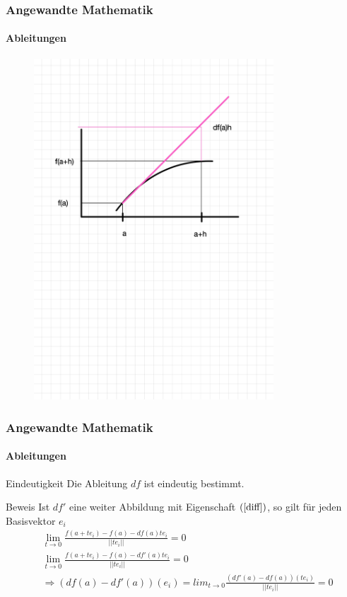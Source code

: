 \documentclass{beamer}
\begin{document}
  \begin{frame}
    \frametitle{Angewandte Mathematik}
    \framesubtitle{Ableitungen}

\begin{figure}[H]
      \centering
    \includegraphics[width=0.8\textwidth]{images/df}
\end{figure}

 \end{frame}





    \begin{frame}
        \frametitle{Angewandte Mathematik}
        \framesubtitle{Ableitungen}
        \begin{block}{Eindeutigkeit}
    Die Ableitung  $df$ ist eindeutig bestimmt.
    \end{block}
        \begin{block}{Beweis}
    Ist $df'$ eine weiter Abbildung mit Eigenschaft $(\ref{diff})$, so gilt für jeden Basisvektor $e_i$
    \begin{align}
    & \lim_{t \to 0} \frac{f(a+te_i) - f(a) - df(a)t e_i }{||t e_i||} = 0 \\
     & \lim_{t \to 0} \frac{f(a+te_i) - f(a) - df'(a)t e_i }{||t e_i||}  = 0\\
    & \Rightarrow (df(a) - df'(a))(e_i) = lim_{t \to 0}\frac{(df'(a) - df(a))(t e_i)}{||te_i||} = 0
    \end{align}
    \end{block}
     \end{frame}
    
\end{document}
